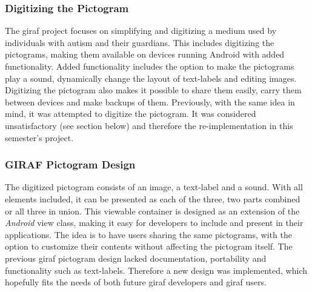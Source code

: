 \subsubsection*{Digitizing the Pictogram}
The \ac{giraf} project focuses on simplifying and digitizing a medium used by individuals with autism and their guardians. This includes digitizing the pictograms, making them available on devices running Android with added functionality. Added functionality includes the option to make the pictograms play a sound, dynamically change the layout of text-labels and editing images. Digitizing the pictogram also makes it possible to share them easily, carry them between devices and make backups of them. Previously, with the same idea in mind, it was attempted to digitize the pictogram. It was considered unsatisfactory (see section below) and therefore the re-implementation in this semester's project.

\subsubsection*{GIRAF Pictogram Design}
The digitized pictogram consists of an image, a text-label and a sound. With all elements included, it can be presented as each of the three, two parts combined or all three in union. This viewable container is designed as an extension of the \emph{Android} view class, making it easy for developers to include and present in their applications. The idea is to have users sharing the same pictograms, with the option to customize their contents without affecting the pictogram itself. The previous \ac{giraf} pictogram design lacked documentation, portability and functionality such as text-labels. Therefore a new design was implemented, which hopefully fits the needs of both future \ac{giraf} developers and \ac{giraf} users.
